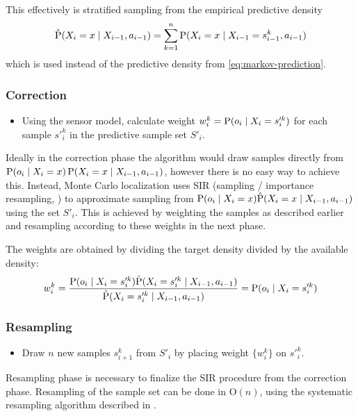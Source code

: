 	This effectively is stratified sampling from the empirical predictive density
	\begin{equation}
		\label{eq:mcl-predictive-density}
		\hat{\operatorname{\mathrm{P}}}(X_i = x \mid X_{i - 1}, a_{i - 1}) =
		\sum_{k = 1}^n \operatorname{\mathrm{P}}(X_i = x \mid X_{i-1} = s^k_{i-1}, a_{i - 1})
	\end{equation}
	which is used instead of the predictive density from \eqref{eq:markov-prediction}.

\subsubsection{Correction}
	\begin{itemize}
	\item
	Using the sensor model, calculate weight \(w^k_i = \operatorname{\mathrm{P}}(o_i \mid X_i = s'^k_i)\)
	for each sample \(s'^k_i\) in the predictive sample set \(S'_i\).
	\end{itemize}

	Ideally in the correction phase the algorithm would draw samples directly from
	\(\operatorname{\mathrm{P}}(o_i \mid X_i = x) \operatorname{\mathrm{P}}(X_i = x \mid X_{i - 1}, a_{i - 1})\),
	however there is no easy way to achieve this.
	Instead, Monte Carlo localization 
	uses SIR (sampling / importance resampling, \cite{smith92})
	to approximate sampling from
	\(\operatorname{\mathrm{P}}(o_i \mid X_i = x) \hat{\operatorname{\mathrm{P}}}(X_i = x \mid X_{i - 1}, a_{i - 1})\) using the set \(S'_i\).
	This is achieved by weighting the samples as described earlier and resampling
	according to these weights in the next phase.

	The weights are obtained by dividing the target density divided by the available density:
	\begin{equation}
		w^k_i = 
		\frac{
			\operatorname{\mathrm{P}}(o_i \mid X_i = s'^k_i) \hat{\operatorname{\mathrm{P}}}(X_i = s'^k_i \mid X_{i - 1}, a_{i - 1})
		}{
			\hat{\operatorname{\mathrm{P}}}(X_i =  s'^k_i \mid X_{i - 1}, a_{i - 1})
		} = \operatorname{\mathrm{P}}(o_i \mid X_i = s'^k_i)
	\end{equation}

\subsubsection{Resampling}
	\begin{itemize}
	\item
	Draw \(n\) new samples \(s^k_{i+1}\) from \(S'_i\) by placing
	weight \(\{w^k_i\}\) on \(s'^k_{i}\).
	\end{itemize}

	Resampling phase is necessary to finalize the SIR procedure from the correction phase.
	Resampling of the sample set can be done in \(\mathrm{O}(n)\), using the systematic
	resampling algorithm described in \cite{arulampalam01}.

